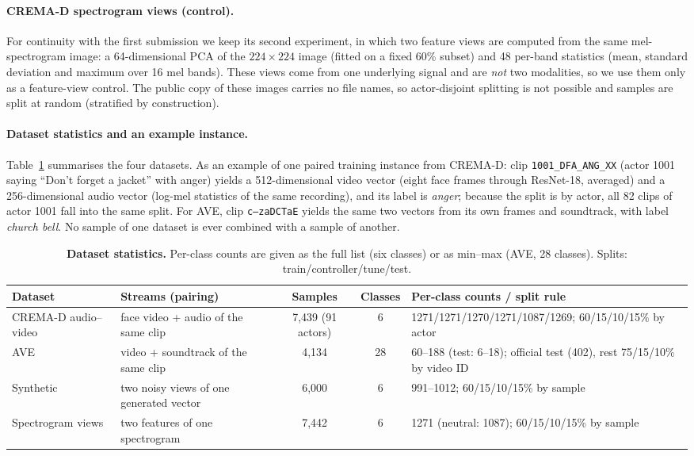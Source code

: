 \documentclass[fleqn,10pt]{wlscirep}
\begin{document}
\paragraph{CREMA-D spectrogram views (control).} For continuity with the first submission we keep its second experiment, in which two feature views are computed from the same mel-spectrogram image: a 64-dimensional PCA of the $224{\times}224$ image (fitted on a fixed 60\% subset) and 48 per-band statistics (mean, standard deviation and maximum over 16 mel bands). These views come from one underlying signal and are \emph{not} two modalities, so we use them only as a feature-view control. The public copy of these images carries no file names, so actor-disjoint splitting is not possible and samples are split at random (stratified by construction).

\paragraph{Dataset statistics and an example instance.} Table~\ref{tab:datasets} summarises the four datasets. As an example of one paired training instance from CREMA-D: clip \texttt{1001\_DFA\_ANG\_XX} (actor 1001 saying ``Don't forget a jacket'' with anger) yields a 512-dimensional video vector (eight face frames through ResNet-18, averaged) and a 256-dimensional audio vector (log-mel statistics of the same recording), and its label is \emph{anger}; because the split is by actor, all 82 clips of actor 1001 fall into the same split. For AVE, clip \texttt{c---zaDCTaE} yields the same two vectors from its own frames and soundtrack, with label \emph{church bell}. No sample of one dataset is ever combined with a sample of another.

\begin{table}[t]
\caption{\textbf{Dataset statistics.} Per-class counts are given as the full list (six classes) or as min--max (AVE, 28 classes). Splits: train/controller/tune/test.}
\label{tab:datasets}
\centering
\footnotesize
\setlength{\tabcolsep}{3pt}
\begin{tabularx}{\linewidth}{@{}lXccl@{}}
\toprule
\textbf{Dataset} & \textbf{Streams (pairing)} & \textbf{Samples} & \textbf{Classes} & \textbf{Per-class counts / split rule} \\ \midrule
CREMA-D audio--video & face video + audio of the same clip & 7,439 (91 actors) & 6 & 1271/1271/1270/1271/1087/1269; 60/15/10/15\% by actor \\
AVE & video + soundtrack of the same clip & 4,134 & 28 & 60--188 (test: 6--18); official test (402), rest 75/15/10\% by video ID \\
Synthetic & two noisy views of one generated vector & 6,000 & 6 & 991--1012; 60/15/10/15\% by sample \\
Spectrogram views & two features of one spectrogram & 7,442 & 6 & 1271 (neutral: 1087); 60/15/10/15\% by sample \\ \bottomrule
\end{tabularx}
\end{table}
\end{document}
